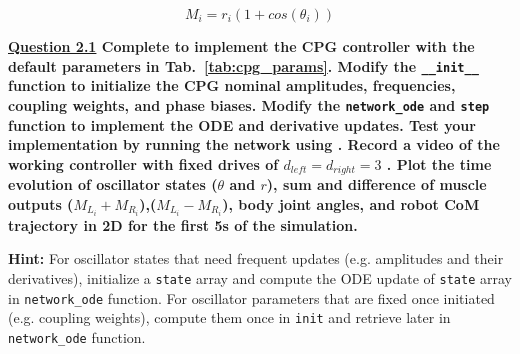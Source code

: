 \documentclass{cmc}
\begin{document}
\begin{equation}
  \label{eq:output_body}
  M_i = r_i(1 + cos(\theta_i))
\end{equation}

\textbf{\underline{Question 2.1} Complete  to implement the CPG controller with the default parameters in Tab.~\ref{tab:cpg_params}. Modify the \texttt{\_\_init\_\_} function to initialize the CPG nominal amplitudes, frequencies, coupling weights, and phase biases. Modify the \texttt{network\_ode} and \texttt{step} function to implement the ODE and derivative updates. Test your implementation by running the network using . Record a video of the working controller with fixed drives of $d_{left}=d_{right}=3$ . Plot the time evolution of oscillator states ($\theta$ and $r$), sum and difference of muscle outputs ($M_{L_i}+M_{R_i}$),($M_{L_i}-M_{R_i}$), body joint angles, and robot CoM trajectory in 2D for the first 5s of the simulation.
}

\textbf{Hint:} For oscillator states that need frequent updates (e.g. amplitudes and their derivatives), initialize a \texttt{state} array and compute the ODE update of \texttt{state} array in \texttt{network\_ode} function. For oscillator parameters that are fixed once initiated (e.g. coupling weights), compute them once in \texttt{init} and retrieve later in \texttt{network\_ode} function.
\end{document}
